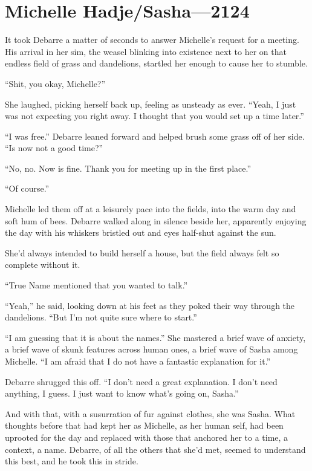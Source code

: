 \hypertarget{michelle-hadjesasha-2124}{%
\chapter{Michelle Hadje/Sasha—2124}\label{michelle-hadjesasha-2124}}

It took Debarre a matter of seconds to answer Michelle's request for a meeting. His arrival in her sim, the weasel blinking into existence next to her on that endless field of grass and dandelions, startled her enough to cause her to stumble.

``Shit, you okay, Michelle?''

She laughed, picking herself back up, feeling as unsteady as ever. ``Yeah, I just was not expecting you right away. I thought that you would set up a time later.''

``I was free.'' Debarre leaned forward and helped brush some grass off of her side. ``Is now not a good time?''

``No, no. Now is fine. Thank you for meeting up in the first place.''

``Of course.''

Michelle led them off at a leisurely pace into the fields, into the warm day and soft hum of bees. Debarre walked along in silence beside her, apparently enjoying the day with his whiskers bristled out and eyes half-shut against the sun.

She'd always intended to build herself a house, but the field always felt so complete without it.

``True Name mentioned that you wanted to talk.''

``Yeah,'' he said, looking down at his feet as they poked their way through the dandelions. ``But I'm not quite sure where to start.''

``I am guessing that it is about the names.'' She mastered a brief wave of anxiety, a brief wave of skunk features across human ones, a brief wave of Sasha among Michelle. ``I am afraid that I do not have a fantastic explanation for it.''

Debarre shrugged this off. ``I don't need a great explanation. I don't need anything, I guess. I just want to know what's going on, Sasha.''

And with that, with a susurration of fur against clothes, she was Sasha. What thoughts before that had kept her as Michelle, as her human self, had been uprooted for the day and replaced with those that anchored her to a time, a context, a name. Debarre, of all the others that she'd met, seemed to understand this best, and he took this in stride.

